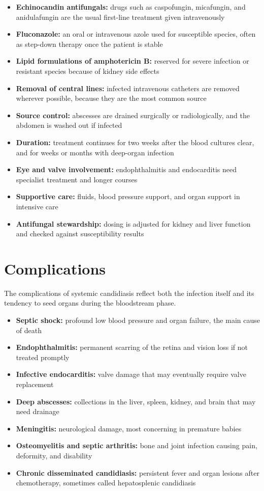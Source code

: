 \begin{itemize}
    \item \textbf{Echinocandin antifungals:} drugs such as caspofungin, micafungin, and anidulafungin are the usual first-line treatment given intravenously
    \item \textbf{Fluconazole:} an oral or intravenous azole used for susceptible species, often as step-down therapy once the patient is stable
    \item \textbf{Lipid formulations of amphotericin B:} reserved for severe infection or resistant species because of kidney side effects
    \item \textbf{Removal of central lines:} infected intravenous catheters are removed wherever possible, because they are the most common source
    \item \textbf{Source control:} abscesses are drained surgically or radiologically, and the abdomen is washed out if infected
    \item \textbf{Duration:} treatment continues for two weeks after the blood cultures clear, and for weeks or months with deep-organ infection
    \item \textbf{Eye and valve involvement:} endophthalmitis and endocarditis need specialist treatment and longer courses
    \item \textbf{Supportive care:} fluids, blood pressure support, and organ support in intensive care
    \item \textbf{Antifungal stewardship:} dosing is adjusted for kidney and liver function and checked against susceptibility results
\end{itemize}

\section*{Complications}
The complications of systemic candidiasis reflect both the infection itself and its tendency to seed organs during the bloodstream phase.

\begin{itemize}
    \item \textbf{Septic shock:} profound low blood pressure and organ failure, the main cause of death
    \item \textbf{Endophthalmitis:} permanent scarring of the retina and vision loss if not treated promptly
    \item \textbf{Infective endocarditis:} valve damage that may eventually require valve replacement
    \item \textbf{Deep abscesses:} collections in the liver, spleen, kidney, and brain that may need drainage
    \item \textbf{Meningitis:} neurological damage, most concerning in premature babies
    \item \textbf{Osteomyelitis and septic arthritis:} bone and joint infection causing pain, deformity, and disability
    \item \textbf{Chronic disseminated candidiasis:} persistent fever and organ lesions after chemotherapy, sometimes called hepatosplenic candidiasis
\end{itemize}

